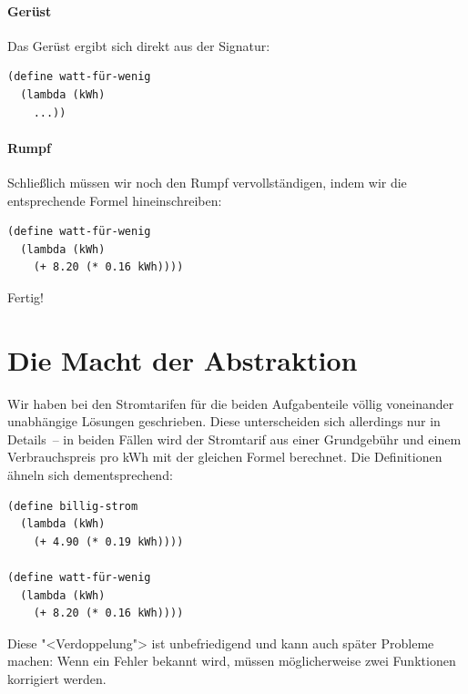 \paragraph{Gerüst}

Das Gerüst ergibt sich direkt aus der Signatur:
%
\begin{verbatim}
(define watt-für-wenig
  (lambda (kWh)
    ...))
\end{verbatim}

\paragraph{Rumpf}

Schließlich müssen wir noch den Rumpf vervollständigen, indem wir die
entsprechende Formel hineinschreiben:
%
\begin{verbatim}
(define watt-für-wenig
  (lambda (kWh)
    (+ 8.20 (* 0.16 kWh))))
\end{verbatim}
%
Fertig!

\section{Die Macht der Abstraktion}
\label{sec:abstraktion}

Wir haben bei den Stromtarifen für die beiden
Aufgabenteile völlig voneinander unabhängige Lösungen geschrieben.
Diese unterscheiden sich allerdings nur in Details~-- in beiden Fällen
wird der Stromtarif aus einer Grundgebühr und einem Verbrauchspreis
pro kWh mit der gleichen Formel berechnet.  Die Definitionen ähneln
sich dementsprechend:
%
\begin{verbatim}
(define billig-strom
  (lambda (kWh)
    (+ 4.90 (* 0.19 kWh))))

(define watt-für-wenig
  (lambda (kWh)
    (+ 8.20 (* 0.16 kWh))))
\end{verbatim}
%
Diese "<Verdoppelung"> ist unbefriedigend und kann auch später
Probleme machen: Wenn ein Fehler bekannt wird, müssen möglicherweise
zwei Funktionen korrigiert werden.

